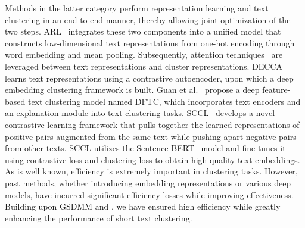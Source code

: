 Methods in the latter category perform representation learning and text clustering in an end-to-end manner, thereby allowing joint optimization of the two steps. ARL~\cite{arl} integrates these two components into a unified model that constructs low-dimensional text representations from one-hot encoding through word embedding and mean pooling. Subsequently, attention techniques~\cite{attention} are leveraged between text representations and cluster representations. DECCA~\cite{DECCA} learns text representations using a contrastive autoencoder, upon which a deep embedding clustering framework is built. Guan et al.~\cite{guan2020deep} propose a deep feature-based text clustering model named DFTC, which incorporates text encoders and an explanation module into text clustering tasks. SCCL~\cite{SCCL} develops a novel contrastive learning framework that pulls together the learned representations of positive pairs augmented from the same text while pushing apart negative pairs from other texts. SCCL utilizes the Sentence-BERT~\cite{conneau2017supervised} model and fine-tunes it using contrastive loss and clustering loss to obtain high-quality text embeddings. As is well known, efficiency is extremely important in clustering tasks. 
However, past methods, whether introducing embedding representations or various deep models, have incurred significant efficiency losses while improving effectiveness. Building upon GSDMM and \sysname{}, we have ensured high efficiency while greatly enhancing the performance of short text clustering.
